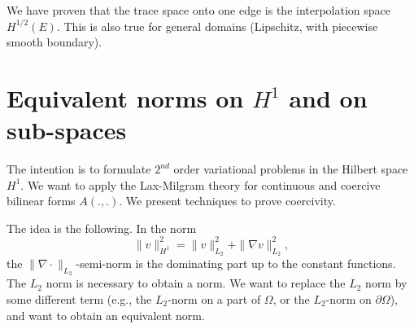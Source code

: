We have proven that the trace space onto one edge is the interpolation 
space $H^{1/2}(E)$. This is also true for general domains (Lipschitz, with piecewise smooth boundary). 










\section{Equivalent norms on $H^1$ and on sub-spaces}

The intention is to formulate $2^{nd}$ order variational problems in the 
Hilbert space $H^1$. We want to apply the Lax-Milgram theory for continuous
and coercive bilinear forms $A(.,.)$. We present techniques to prove
coercivity.

The idea is the following. In the norm
$$
\| v \|_{H^1}^2 = \| v \|_{L_2}^2 + \| \nabla v \|_{L_2}^2,
$$
%
the $\| \nabla \cdot \|_{L_2}$-semi-norm is the dominating part up to
the constant functions. The $L_2$ norm is necessary to obtain a
norm. We want to replace the $L_2$ norm by some different term (e.g.,
the $L_2$-norm on a part of $\Omega$, or the $L_2$-norm on $\partial
\Omega$), and want to obtain an equivalent norm.


